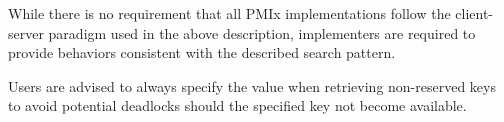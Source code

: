 \adviceimplstart
While there is no requirement that all \ac{PMIx} implementations follow the
client-server paradigm used in the above description, implementers are
required to provide behaviors consistent with the described search pattern.
\adviceimplend

\adviceuserstart
Users are advised to always specify the  value when
retrieving non-reserved keys to avoid potential deadlocks should the specified
key not become available.
\adviceuserend

